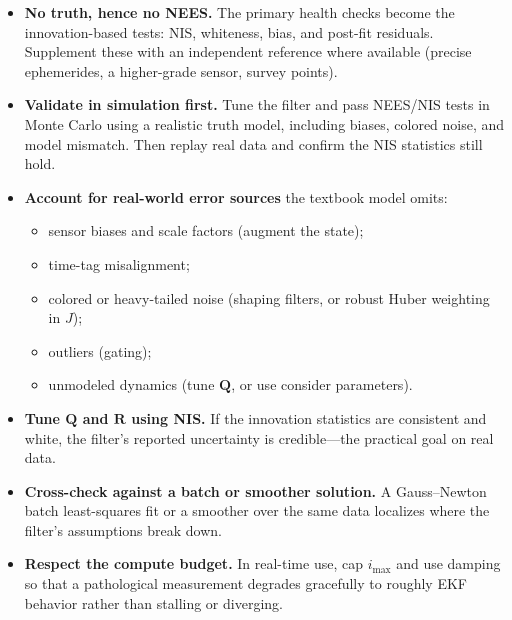 \documentclass[11pt]{article}
\newcommand{\Q}{\bm{Q}}
\newcommand{\R}{\bm{R}}
\begin{document}
\begin{itemize}
  \item \textbf{No truth, hence no NEES.} The primary health checks become the
        innovation-based tests: NIS, whiteness, bias, and post-fit residuals. Supplement these
        with an independent reference where available (precise ephemerides, a higher-grade
        sensor, survey points).
  \item \textbf{Validate in simulation first.} Tune the filter and pass NEES/NIS tests in Monte
        Carlo using a realistic truth model, including biases, colored noise, and model
        mismatch. Then replay real data and confirm the NIS statistics still hold.
  \item \textbf{Account for real-world error sources} the textbook model omits:
  \begin{itemize}
    \item sensor biases and scale factors (augment the state);
    \item time-tag misalignment;
    \item colored or heavy-tailed noise (shaping filters, or robust Huber weighting in $J$);
    \item outliers (gating);
    \item unmodeled dynamics (tune $\Q$, or use consider parameters).
  \end{itemize}
  \item \textbf{Tune $\Q$ and $\R$ using NIS.} If the innovation statistics are consistent and
        white, the filter's reported uncertainty is credible---the practical goal on real data.
  \item \textbf{Cross-check against a batch or smoother solution.} A Gauss--Newton batch
        least-squares fit or a smoother over the same data localizes where the filter's
        assumptions break down.
  \item \textbf{Respect the compute budget.} In real-time use, cap $i_{\max}$ and use damping
        so that a pathological measurement degrades gracefully to roughly EKF behavior rather
        than stalling or diverging.
\end{itemize}

\nocite{sarkka2013}
\printbibliography
\end{document}
